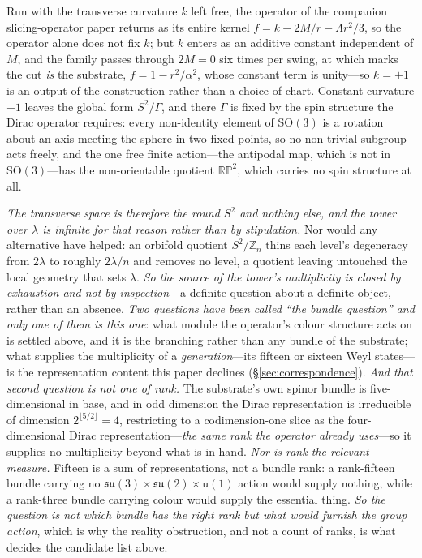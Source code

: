 \documentclass[11pt]{article}
\newcommand{\su}{\mathfrak{su}}
\begin{document}
Run with the transverse curvature $k$ left free, the operator of the companion slicing-operator
paper returns as its entire kernel $f=k-2M/r-\Lambda r^{2}/3$, so the operator alone does not fix $k$; but $k$
enters as an additive constant independent of $M$, and the family passes through $2M=0$ six times per swing,
at which marks the cut \emph{is} the substrate, $f=1-r^{2}/\alpha^{2}$, whose constant term is
unity---so $k=+1$ is an output of the construction rather than a choice of chart. Constant curvature $+1$
leaves the global form $S^{2}/\Gamma$, and there $\Gamma$ is fixed by the spin structure the Dirac operator
requires: every non-identity element of $\mathrm{SO}(3)$ is a rotation about an axis meeting the sphere in two
fixed points, so no non-trivial subgroup acts freely, and the one free finite action---the antipodal map, which
is not in $\mathrm{SO}(3)$---has the non-orientable quotient $\mathbb{RP}^{2}$, which carries no spin
structure at all. 

\emph{The transverse space is therefore the round $S^{2}$ and nothing else, and the tower
over $\lambda$ is infinite for that reason rather than by stipulation.} Nor would any alternative have helped:
an orbifold quotient $S^{2}/\mathbb{Z}_{n}$ thins each level's degeneracy from $2\lambda$ to roughly
$2\lambda/n$ and removes no level, a quotient leaving untouched the local geometry that sets $\lambda$.
\emph{So the source of the tower's multiplicity is closed by exhaustion and not by inspection}---a definite
question about a definite object, rather than an absence. \emph{Two questions have been called ``the bundle
question'' and only one of them is this one}: what module the operator's colour structure acts on is settled
above, and it is the branching rather than any bundle of the substrate; what supplies the multiplicity of a
\emph{generation}---its fifteen or sixteen Weyl states---is the representation content this paper declines
(\S\ref{sec:correspondence}). \emph{And that second question is not one of rank.} The substrate's own spinor
bundle is five-dimensional in base, and in odd dimension the Dirac representation is irreducible of dimension
$2^{\lfloor5/2\rfloor}=4$, restricting to a codimension-one slice as the four-dimensional Dirac
representation---\emph{the same rank the operator already uses}---so it supplies no
multiplicity beyond what is in hand. \emph{Nor is rank the relevant measure.} Fifteen is a sum of
representations, not a bundle rank: a rank-fifteen bundle carrying no $\su(3)\times\su(2)\times\mathrm{u}(1)$
action would supply nothing, while a rank-three bundle carrying colour would supply the essential thing.
\emph{So the question is not which bundle has the right rank but what would furnish the group action}, which is
why the reality obstruction, and not a count of ranks, is what decides the candidate list above.
\end{document}
